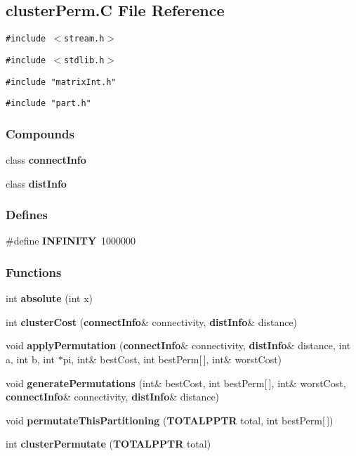 \subsection{cluster\-Perm.C File Reference}
\label{clusterPerm.C}
{\tt \#include $<$stream.h$>$}\par
{\tt \#include $<$stdlib.h$>$}\par
{\tt \#include "matrix\-Int.h"}\par
{\tt \#include "part.h"}\par
\subsubsection*{Compounds}
\begin{CompactItemize}
\item 
class {\bf connect\-Info}
\item 
class {\bf dist\-Info}
\end{CompactItemize}
\subsubsection*{Defines}
\begin{CompactItemize}
\item 
\#define {\bf INFINITY}\ 1000000
\end{CompactItemize}
\subsubsection*{Functions}
\begin{CompactItemize}
\item 
int {\bf absolute} (int x)
\item 
int {\bf cluster\-Cost} ({\bf connect\-Info}\& connectivity, {\bf dist\-Info}\& distance)
\item 
void {\bf apply\-Permutation} ({\bf connect\-Info}\& connectivity, {\bf dist\-Info}\& distance, int a, int b, int $\ast$pi, int\& best\-Cost, int best\-Perm[$\,$], int\& worst\-Cost)
\item 
void {\bf generate\-Permutations} (int\& best\-Cost, int best\-Perm[$\,$], int\& worst\-Cost, {\bf connect\-Info}\& connectivity, {\bf dist\-Info}\& distance)
\item 
void {\bf permutate\-This\-Partitioning} ({\bf TOTALPPTR} total, int best\-Perm[$\,$])
\item 
int {\bf cluster\-Permutate} ({\bf TOTALPPTR} total)
\end{CompactItemize}


